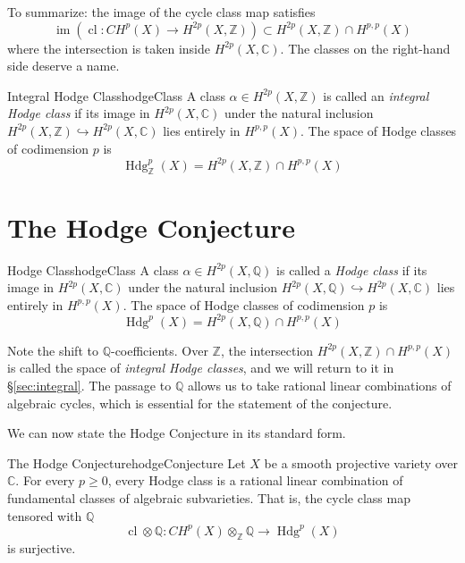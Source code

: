 \documentclass{article}
\newcommand{\C}{\mathbb{C}}
\newcommand{\Q}{\mathbb{Q}}
\newcommand{\Z}{{\mathbb{Z}}}
\newcommand{\cl}{\operatorname{cl}}
\newcommand{\im}{\operatorname{im}}
\begin{document}
To summarize: the image of the cycle class map satisfies
\[
  \im(\cl: CH^p(X) \to H^{2p}(X, \Z)) \subset H^{2p}(X, \Z) \cap H^{p,p}(X)
\]
where the intersection is taken inside $H^{2p}(X, \C)$. The classes on the
right-hand side deserve a name.

\begin{defn}{Integral Hodge Class}{hodgeClass}
  A class $\alpha \in H^{2p}(X, \Z)$ is called an \emph{integral Hodge class} if its
  image in $H^{2p}(X, \C)$ under the natural inclusion
  $H^{2p}(X, \Z) \hookrightarrow H^{2p}(X, \C)$ lies entirely in $H^{p,p}(X)$.
  The space of Hodge classes of codimension $p$ is
  \[
    \operatorname{Hdg}_\Z^p(X) = H^{2p}(X, \Z) \cap H^{p,p}(X)
  \]
\end{defn}

\section{The Hodge Conjecture}\label{sec:hodgeConjecture}



\begin{defn}{Hodge Class}{hodgeClass}
  A class $\alpha \in H^{2p}(X, \Q)$ is called a \emph{Hodge class} if its
image in $H^{2p}(X, \C)$ under the natural inclusion
$H^{2p}(X, \Q) \hookrightarrow H^{2p}(X, \C)$ lies entirely in $H^{p,p}(X)$.
The space of Hodge classes of codimension $p$ is
\[
  \operatorname{Hdg}^p(X) = H^{2p}(X, \Q) \cap H^{p,p}(X)
\]
\end{defn}


Note the shift to $\Q$-coefficients. Over $\Z$, the intersection
$H^{2p}(X, \Z) \cap H^{p,p}(X)$ is called the space of \emph{integral Hodge
classes}, and we will return to it in \S\ref{sec:integral}. The passage to
$\Q$ allows us to take rational linear combinations of algebraic cycles, which
is essential for the statement of the conjecture.

We can now state the Hodge Conjecture in its standard form.

\begin{conjecture}{The Hodge Conjecture}{hodgeConjecture}
  Let $X$ be a smooth projective variety over $\C$. For every $p \geq 0$,
  every Hodge class is a rational linear combination of fundamental classes of
  algebraic subvarieties. That is, the cycle class map tensored with $\Q$
  \[
    \cl \otimes \Q: CH^p(X) \otimes_\Z \Q \longrightarrow \operatorname{Hdg}^p(X)
  \]
  is surjective.
\end{conjecture}
\end{document}
